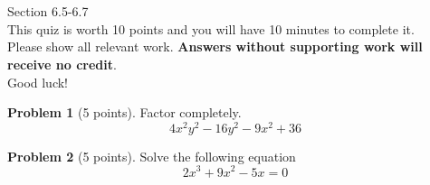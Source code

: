 \documentclass[11pt]{article}
\theoremstyle{definition}
\newtheorem{problem}{Problem}
\begin{document}
\section*{}
Section 6.5-6.7\\
This quiz is worth 10 points and you will have 10 minutes to complete it.\\
Please show all relevant work. \textbf{Answers without supporting work will receive no credit}.\\
Good luck!
\begin{problem}[5 points] Factor completely.
\[4x^{2}y^{2}-16y^{2}-9x^{2}+36\]


\end{problem}


\vspace{2in}

\begin{problem}[5 points] Solve the following equation
\[
2x^{3}+9x^{2}-5x=0
\]
\end{problem}
\end{document}
